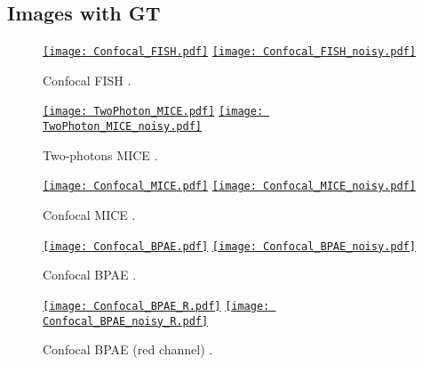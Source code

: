 \documentclass{report}%
\begin{document}
\begin{appendix}

\chapter{Images with \gls{GT}}
\label{sec:images}  
  
\begin{figure}[h]
  \centering
  \href{https://nbviewer.org/github/vicente-gonzalez-ruiz/denoising/blob/main/notebooks/Confocal_FISH.ipynb}{\texttt{[image: Confocal\_FISH.pdf]}}
  \href{https://nbviewer.org/github/vicente-gonzalez-ruiz/denoising/blob/main/notebooks/Confocal_FISH_noisy.ipynb}{\texttt{[image: Confocal\_FISH\_noisy.pdf]}}
  \caption{Confocal FISH \cite{zhang2019poisson}.\label{fig:Confocal_FISH}}
\end{figure}

\begin{figure}[h]
  \centering
  \href{https://nbviewer.org/github/vicente-gonzalez-ruiz/denoising/blob/main/notebooks/TwoPhoton_MICE.ipynb}{\texttt{[image: TwoPhoton\_MICE.pdf]}}
  \href{https://nbviewer.org/github/vicente-gonzalez-ruiz/denoising/blob/main/notebooks/TwoPhoton_MICE_noisy.ipynb}{\texttt{[image: TwoPhoton\_MICE\_noisy.pdf]}}
  \caption{Two-photons MICE \cite{zhang2019poisson}.\label{fig:TwoPhoton_MICE}}
\end{figure}

\begin{figure}[h]
  \centering
  \href{https://nbviewer.org/github/vicente-gonzalez-ruiz/denoising/blob/main/notebooks/Confocal_MICE.ipynb}{\texttt{[image: Confocal\_MICE.pdf]}}
  \href{https://nbviewer.org/github/vicente-gonzalez-ruiz/denoising/blob/main/notebooks/Confocal_MICE_noisy.ipynb}{\texttt{[image: Confocal\_MICE\_noisy.pdf]}}
  \caption{Confocal MICE \cite{zhang2019poisson}.\label{fig:Confocal_MICE}}
\end{figure}

\begin{figure}[h]
  \centering
  \href{https://nbviewer.org/github/vicente-gonzalez-ruiz/denoising/blob/main/notebooks/Confocal_BPAE.ipynb}{\texttt{[image: Confocal\_BPAE.pdf]}}
  \href{https://nbviewer.org/github/vicente-gonzalez-ruiz/denoising/blob/main/notebooks/Confocal_BPAE.ipynb}{\texttt{[image: Confocal\_BPAE\_noisy.pdf]}}
  \caption{Confocal BPAE \cite{zhang2019poisson}.\label{fig:Confocal_BPAE}}
\end{figure}

\begin{figure}[h]
  \centering
  \href{https://nbviewer.org/github/vicente-gonzalez-ruiz/denoising/blob/main/notebooks/Confocal_BPAE.ipynb}{\texttt{[image: Confocal\_BPAE\_R.pdf]}}
  \href{https://nbviewer.org/github/vicente-gonzalez-ruiz/denoising/blob/main/notebooks/Confocal_BPAE.ipynb}{\texttt{[image: Confocal\_BPAE\_noisy\_R.pdf]}}
  \caption{Confocal BPAE (red channel) \cite{zhang2019poisson}.\label{fig:Confocal_BPAE_R}}
\end{figure}


\end{appendix}
\end{document}
